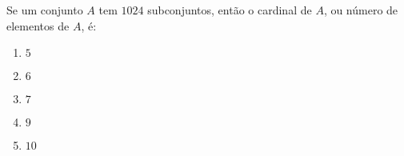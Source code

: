 \item Se um conjunto $A$ tem $1024$ subconjuntos, então o cardinal de $A$, ou número de elementos de $A$, é:
  \begin{multicols}{5}
	\begin{enumerate}
\item $5$
\item $6$
\item $7$
\item $9$
\item $10$
	\end{enumerate}
  \end{multicols}

